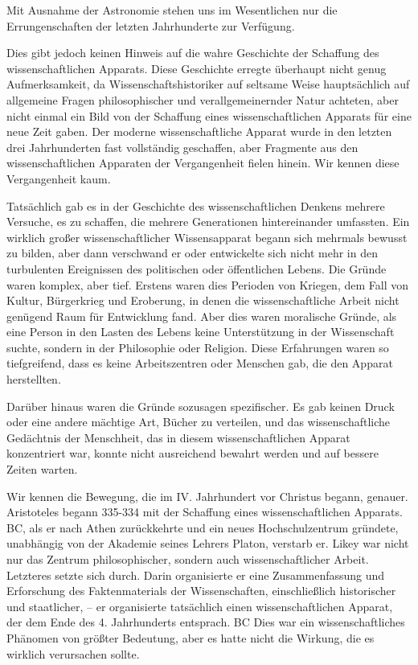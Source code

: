 \documentclass[11pt,a4paper]{book}
\begin{document}
Mit Ausnahme der Astronomie stehen uns im Wesentlichen nur die Errungenschaften der letzten Jahrhunderte zur Verfügung.



Dies gibt jedoch keinen Hinweis auf die wahre Geschichte der Schaffung des wissenschaftlichen Apparats. Diese Geschichte erregte überhaupt nicht genug Aufmerksamkeit, da Wissenschaftshistoriker auf seltsame Weise hauptsächlich auf allgemeine Fragen philosophischer und verallgemeinernder Natur achteten, aber nicht einmal ein Bild von der Schaffung eines wissenschaftlichen Apparats für eine neue Zeit gaben. Der moderne wissenschaftliche Apparat wurde in den letzten drei Jahrhunderten fast vollständig geschaffen, aber Fragmente aus den wissenschaftlichen Apparaten der Vergangenheit fielen hinein. Wir kennen diese Vergangenheit kaum.



Tatsächlich gab es in der Geschichte des wissenschaftlichen Denkens mehrere Versuche, es zu schaffen, die mehrere Generationen hintereinander umfassten. Ein wirklich großer wissenschaftlicher Wissensapparat begann sich mehrmals bewusst zu bilden, aber dann verschwand er oder entwickelte sich nicht mehr in den turbulenten Ereignissen des politischen oder öffentlichen Lebens. Die Gründe waren komplex, aber tief. Erstens waren dies Perioden von Kriegen, dem Fall von Kultur, Bürgerkrieg und Eroberung, in denen die wissenschaftliche Arbeit nicht genügend Raum für Entwicklung fand. Aber dies waren moralische Gründe, als eine Person in den Lasten des Lebens keine Unterstützung in der Wissenschaft suchte, sondern in der Philosophie oder Religion. Diese Erfahrungen waren so tiefgreifend, dass es keine Arbeitszentren oder Menschen gab, die den Apparat herstellten.



Darüber hinaus waren die Gründe sozusagen spezifischer. Es gab keinen Druck oder eine andere mächtige Art, Bücher zu verteilen, und das wissenschaftliche Gedächtnis der Menschheit, das in diesem wissenschaftlichen Apparat konzentriert war, konnte nicht ausreichend bewahrt werden und auf bessere Zeiten warten.



Wir kennen die Bewegung, die im IV. Jahrhundert vor Christus begann, genauer. Aristoteles begann 335-334 mit der Schaffung eines wissenschaftlichen Apparats. BC, als er nach Athen zurückkehrte und ein neues Hochschulzentrum gründete, unabhängig von der Akademie seines Lehrers Platon, verstarb er. Likey war nicht nur das Zentrum philosophischer, sondern auch wissenschaftlicher Arbeit. Letzteres setzte sich durch. Darin organisierte er eine Zusammenfassung und Erforschung des Faktenmaterials der Wissenschaften, einschließlich historischer und staatlicher, -- er organisierte tatsächlich einen wissenschaftlichen Apparat, der dem Ende des 4. Jahrhunderts entsprach. BC Dies war ein wissenschaftliches Phänomen von größter Bedeutung, aber es hatte nicht die Wirkung, die es wirklich verursachen sollte.
\end{document}
